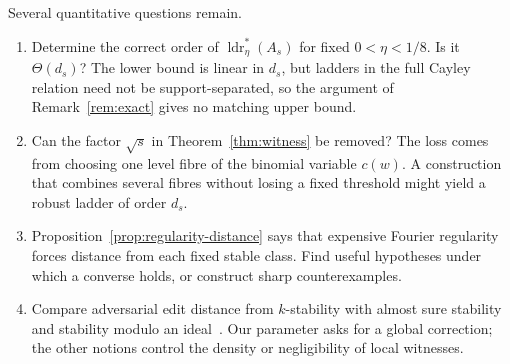 \documentclass[11pt]{article}
\theoremstyle{plain}
\theoremstyle{definition}
\numberwithin{theorem}{section}
\newcommand{\ldrs}{\operatorname{ldr}^{*}}
\begin{document}
Several quantitative questions remain.
\begin{enumerate}
\item Determine the correct order of $\ldrs_\eta(A_s)$ for fixed
  $0<\eta<1/8$.  Is it $\Theta(d_s)$?  The lower bound is linear in $d_s$,
  but ladders in the full Cayley relation need not be support-separated, so
  the argument of Remark~\ref{rem:exact} gives no matching upper bound.
\item Can the factor $\sqrt{s}$ in Theorem~\ref{thm:witness} be removed?
  The loss comes from choosing one level fibre of the binomial variable
  $c(w)$.  A construction that combines several fibres without losing a
  fixed threshold might yield a robust ladder of order $d_s$.
\item Proposition~\ref{prop:regularity-distance} says that expensive Fourier
  regularity forces distance from each fixed stable class.  Find useful
  hypotheses under which a converse holds, or construct sharp counterexamples.
\item Compare adversarial edit distance from $k$-stability with almost sure
  stability and stability modulo an ideal~\cite{CM,MPPW,Giron}.  Our parameter
  asks for a global correction; the other notions control the density or
  negligibility of local witnesses.
\end{enumerate}
\end{document}
